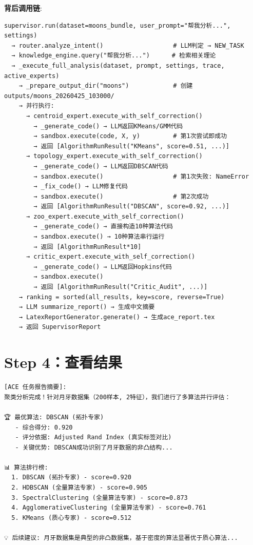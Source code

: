 \documentclass[11pt,a4paper]{ctexbook}
\begin{document}
\textbf{背后调用链}:
\begin{verbatim}
supervisor.run(dataset=moons_bundle, user_prompt="帮我分析...", settings)
  → router.analyze_intent()                   # LLM判定 → NEW_TASK
  → knowledge_engine.query("帮我分析...")      # 检索相关理论
  → _execute_full_analysis(dataset, prompt, settings, trace, active_experts)
    → _prepare_output_dir("moons")            # 创建 outputs/moons_20260425_103000/
    → 并行执行:
      → centroid_expert.execute_with_self_correction()
        → _generate_code() → LLM返回KMeans/GMM代码
        → sandbox.execute(code, X, y)         # 第1次尝试即成功
        → 返回 [AlgorithmRunResult("KMeans", score=0.51, ...)]
      → topology_expert.execute_with_self_correction()
        → _generate_code() → LLM返回DBSCAN代码
        → sandbox.execute()                   # 第1次失败: NameError
        → _fix_code() → LLM修复代码
        → sandbox.execute()                   # 第2次成功
        → 返回 [AlgorithmRunResult("DBSCAN", score=0.92, ...)]
      → zoo_expert.execute_with_self_correction()
        → _generate_code() → 直接构造10种算法代码
        → sandbox.execute() → 10种算法串行运行
        → 返回 [AlgorithmRunResult*10]
      → critic_expert.execute_with_self_correction()
        → _generate_code() → LLM返回Hopkins代码
        → sandbox.execute()
        → 返回 [AlgorithmRunResult("Critic_Audit", ...)]
    → ranking = sorted(all_results, key=score, reverse=True)
    → LLM summarize_report() → 生成中文摘要
    → LatexReportGenerator.generate() → 生成ace_report.tex
    → 返回 SupervisorReport
\end{verbatim}

\section{Step 4：查看结果}

\begin{verbatim}
[ACE 任务报告摘要]:
聚类分析完成！针对月牙数据集（200样本, 2特征），我们进行了多算法并行评估：

🏆 最优算法: DBSCAN (拓扑专家)
   - 综合得分: 0.920
   - 评分依据: Adjusted Rand Index (真实标签对比)
   - 关键优势: DBSCAN成功识别了月牙数据的非凸结构...

📊 算法排行榜:
  1. DBSCAN (拓扑专家) - score=0.920
  2. HDBSCAN (全量算法专家) - score=0.905
  3. SpectralClustering (全量算法专家) - score=0.873
  4. AgglomerativeClustering (全量算法专家) - score=0.761
  5. KMeans (质心专家) - score=0.512

💡 后续建议: 月牙数据集是典型的非凸数据集，基于密度的算法显著优于质心算法...
\end{verbatim}
\end{document}
